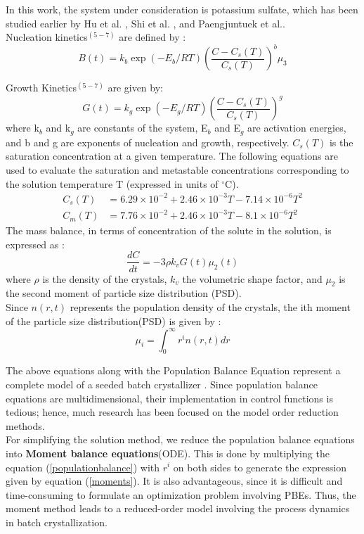 In this work, the system under consideration is potassium sulfate, which has been studied earlier by Hu et al. \cite{hu}, Shi et al. \cite{shi}, and Paengjuntuek et al.\cite{paeng}. \\

Nucleation kinetics$^{(5-7)}$ are defined by :
\begin{equation}
B(t) = k_{b}\exp{\left(-E_{b}/RT \right)}\left(\frac{C - C_{s}(T)}{C_{s}(T)}\right)^{b}\mu_{3}
\end{equation}  


Growth Kinetics$^{(5-7)}$ are given by:
\begin{equation}
G(t) = k_{g}\exp{\left(-E_{g}/RT \right)}\left(\frac{C - C_{s}(T)}{C_{s}(T)}\right)^{g}
\end{equation}
where k$_{b}$ and k$_{g}$ are constants of the system, E$_{b}$ and E$_{g}$ are activation energies, and b and g are exponents of nucleation and growth, respectively. $C_{s}(T)$ is the saturation concentration at a given temperature. The following equations are used to evaluate the saturation and metastable concentrations corresponding to the solution temperature T (expressed in units of $^\circ$C)\cite{shi}.
\begin{align}
C_{s}(T) &= 6.29\times10^{-2} + 2.46\times10^{-3}T - 7.14\times10^{-6}T^{2} \\
C_{m}(T) &= 7.76\times10^{-2} + 2.46\times10^{-3}T - 8.1\times10^{-6}T^{2}
\end{align} 
The mass balance, in terms of concentration of the solute in the solution, is expressed as :
\begin{equation}
\frac{dC}{dt} = -3\rho{}k_{v}G(t)\mu_{2}(t)
\end{equation}
where $\rho{}$ is the density of the crystals, $k_{v}$ the volumetric shape factor, and $\mu_{2}$ is the second moment of particle size distribution (PSD).\\

Since $n(r,t)$ represents the population density of the crystals\cite{randolph}, the ith moment of the particle size distribution(PSD) is given by :
\begin{equation} \label{moments}
\mu_{i} = \int_{0}^{\infty} r^{i}n(r,t) dr
\end{equation}

The above equations along with the Population Balance Equation represent a complete model of a seeded batch crystallizer . 
Since population balance equations are multidimensional, their implementation in control functions is tedious; hence, much research has been focused on the model order reduction methods.\\
For simplifying the solution method, we reduce the population balance equations into \textbf{Moment balance equations}(ODE). This is done by multiplying the equation (\ref{populationbalance})  with $r^{i}$ on both sides to generate the expression given by equation (\ref{moments}). It is also advantageous, since it is difficult and time-consuming to formulate an optimization problem involving PBEs. Thus, the moment method leads to a reduced-order model involving the process dynamics in batch crystallization.

